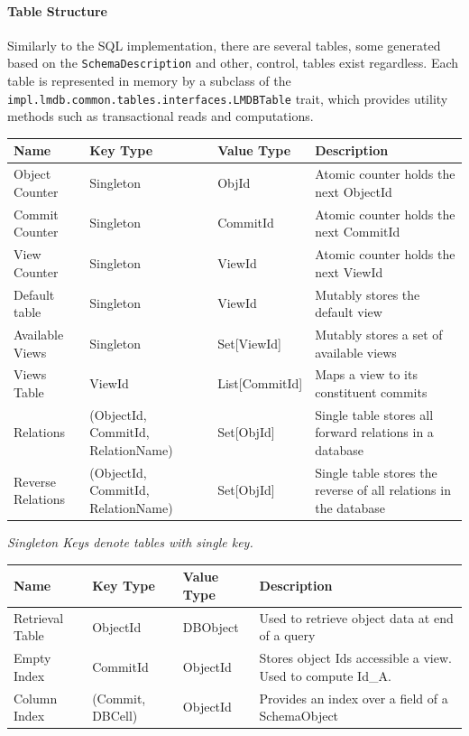 \documentclass[12pt,a4paper,twoside,openright]{report}
\newcommand\codeName[1]{\texttt{#1}}
\newcommand\note[1]{\textit{#1}}
\let\oldparagraph\paragraph
\renewcommand{\paragraph}[1]{\oldparagraph{#1}\mbox{}}
\begin{document}
		\paragraph{Table Structure}
	
 Similarly to the SQL implementation, there are several tables, some generated based on the \codeName{SchemaDescription} and other, control, tables exist regardless. Each table is represented in memory by a subclass of the \codeName{impl.lmdb.common.tables.interfaces.LMDBTable} trait, which provides utility methods such as transactional reads and computations.
 
\begin{center}
	\begin{tabular}{ |p{3cm}||p{3cm}|p{3cm}||p{3cm}|}
 	\hline
 		
	Name & Key Type & Value Type  & Description \\ \hline
	Object Counter & Singleton & ObjId & Atomic counter holds the next ObjectId \\ \hline
	Commit Counter & Singleton & CommitId & Atomic counter holds the next CommitId \\ \hline
	View Counter & Singleton & ViewId & Atomic counter holds the next ViewId \\ \hline
	Default table & Singleton & ViewId & Mutably stores the default view \\ \hline
	Available Views & Singleton & Set[ViewId] & Mutably stores a set of available views \\ \hline
	Views Table & ViewId & List[CommitId] & Maps a view to its constituent commits \\ \hline
	Relations & (ObjectId, CommitId, RelationName) & Set[ObjId] & Single table stores all forward relations in a database \\ \hline
	Reverse Relations & (ObjectId, CommitId, RelationName) & Set[ObjId] & Single table stores the reverse of all relations in the database \\ \hline
	\end{tabular}
\end{center} 
 
 \note{Singleton Keys denote tables with single key.}
 \begin{center}
	\begin{tabular}{ |p{3cm}||p{3cm}|p{3cm}||p{3cm}|}
 	\hline
	Name & Key Type & Value Type  & Description \\ \hline
	Retrieval Table & ObjectId & DBObject & Used to retrieve object data at end of a query \\ \hline
	Empty Index & CommitId & ObjectId & Stores object Ids accessible a view. Used to compute Id_A. \\ \hline
	Column Index &  (Commit, DBCell) & ObjectId & Provides an index over a field of a SchemaObject \\ \hline
	\end{tabular}
\end{center}
\end{document}
